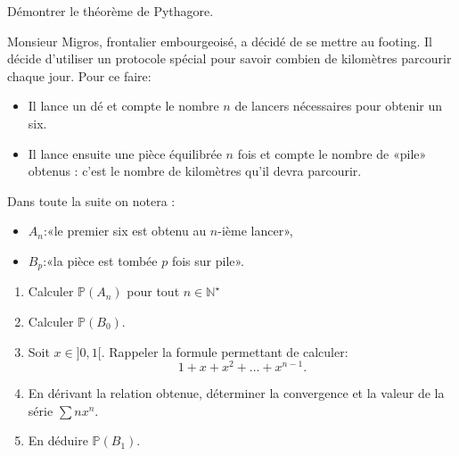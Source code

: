 \documentclass[a4paper,11pt]{article}
\begin{document}
\begin{colle}

\begin{demo}
    Démontrer le théorème de Pythagore.
\end{demo}


\begin{exercice}
    \renewcommand{\labelitemi}{\textbullet}%
    Monsieur Migros, frontalier embourgeoisé, a décidé de se mettre au footing.
    Il décide d'utiliser un protocole spécial pour savoir combien de kilomètres 
    parcourir chaque jour. Pour ce faire:
    \begin{itemize}
       \item Il lance un dé et compte le nombre $n$ de lancers nécessaires pour 
          obtenir un six.
       \item Il lance ensuite une pièce équilibrée $n$ fois et compte le nombre 
            de «pile» obtenus : c'est le nombre de kilomètres qu'il devra 
        parcourir.
    \end{itemize}
    Dans toute la suite on notera :
    \begin{itemize}
       \item $A_n$:«le premier six est obtenu au $n$-ième lancer»,
       \item $B_p$:«la pièce est tombée $p$ fois sur pile».
    \end{itemize}
    \begin{enumerate}
       \item Calculer $\mathbb{P}(A_n)$ pour tout $n\in\mathbb{N}^\star$
       \item Calculer $\mathbb{P}(B_0)$.
       \item Soit $x\in ]0,1[$. Rappeler la formule permettant de calculer:
            \[ 1+x+x^2+\ldots+x^{n-1}.\]
       \item En dérivant la relation obtenue, déterminer la convergence et la 
            valeur de la série $\sum nx^n$.
       \item En déduire $\mathbb{P}(B_1)$.
    \end{enumerate}


\end{exercice}
\end{colle}
\end{document}
